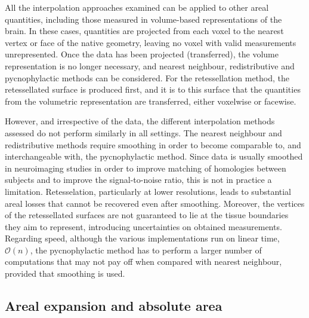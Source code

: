All the interpolation approaches examined can be applied to other areal quantities, including those measured in volume-based representations of the brain. In these cases, quantities are projected from each voxel to the nearest vertex or face of the native geometry, leaving no voxel with valid measurements unrepresented. Once the data has been projected (transferred), the volume representation is no longer necessary, and nearest neighbour, redistributive and pycnophylactic methods can be considered. For the retessellation method, the retessellated surface is produced first, and it is to this surface that the quantities from the volumetric representation are transferred, either voxelwise or facewise.

However, and irrespective of the data, the different interpolation methods assessed do not perform similarly in all settings. The nearest neighbour and redistributive methods require smoothing in order to become comparable to, and interchangeable with, the pycnophylactic method. Since data is usually smoothed in neuroimaging studies in order to improve matching of homologies between subjects and to improve the signal-to-noise ratio, this is not in practice a limitation. Retesselation, particularly at lower resolutions, leads to substantial areal losses that cannot be recovered even after smoothing. Moreover, the vertices of the retessellated surfaces are not guaranteed to lie at the tissue boundaries they aim to represent, introducing uncertainties on obtained measurements. Regarding speed, although the various implementations run on linear time, $\mathcal{O}(n)$, the pycnophylactic method has to perform a larger number of computations that may not pay off when compared with nearest neighbour, provided that smoothing is used.

\subsection{Areal expansion and absolute area}

